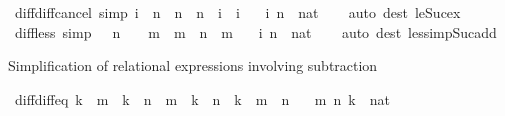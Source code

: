 \begin{isabellebody}
\ diff{\isacharunderscore}{\kern0pt}diff{\isacharunderscore}{\kern0pt}cancel\ {\isacharbrackleft}{\kern0pt}simp{\isacharbrackright}{\kern0pt}{\isacharcolon}{\kern0pt}\ {\isachardoublequoteopen}i\ {\isasymle}\ n\ {\isasymLongrightarrow}\ n\ {\isacharminus}{\kern0pt}\ {\isacharparenleft}{\kern0pt}n\ {\isacharminus}{\kern0pt}\ i{\isacharparenright}{\kern0pt}\ {\isacharequal}{\kern0pt}\ i{\isachardoublequoteclose}\isanewline
\ \ \ i\ n\ {\isacharcolon}{\kern0pt}{\isacharcolon}{\kern0pt}\ nat\isanewline
%
\isadelimproof
\ \ %
\endisadelimproof
%
\isatagproof
{}\isamarkupfalse%
\ {\isacharparenleft}{\kern0pt}auto\ dest{\isacharcolon}{\kern0pt}\ le{\isacharunderscore}{\kern0pt}Suc{\isacharunderscore}{\kern0pt}ex{\isacharparenright}{\kern0pt}%
\endisatagproof
{\isafoldproof}%
%
\isadelimproof
\isanewline
%
\endisadelimproof
\isanewline
{}\isamarkupfalse%
\ diff{\isacharunderscore}{\kern0pt}less\ {\isacharbrackleft}{\kern0pt}simp{\isacharbrackright}{\kern0pt}{\isacharcolon}{\kern0pt}\ {\isachardoublequoteopen}{}\ {\isacharless}{\kern0pt}\ n\ {\isasymLongrightarrow}\ {}\ {\isacharless}{\kern0pt}\ m\ {\isasymLongrightarrow}\ m\ {\isacharminus}{\kern0pt}\ n\ {\isacharless}{\kern0pt}\ m{\isachardoublequoteclose}\isanewline
\ \ \ i\ n\ {\isacharcolon}{\kern0pt}{\isacharcolon}{\kern0pt}\ nat\isanewline
%
\isadelimproof
\ \ %
\endisadelimproof
%
\isatagproof
{}\isamarkupfalse%
\ {\isacharparenleft}{\kern0pt}auto\ dest{\isacharcolon}{\kern0pt}\ less{\isacharunderscore}{\kern0pt}imp{\isacharunderscore}{\kern0pt}Suc{\isacharunderscore}{\kern0pt}add{\isacharparenright}{\kern0pt}%
\endisatagproof
{\isafoldproof}%
%
\isadelimproof
%
\endisadelimproof
%
\begin{isamarkuptext}%
Simplification of relational expressions involving subtraction%
\end{isamarkuptext}\isamarkuptrue%
\isamarkupfalse%
\ diff{\isacharunderscore}{\kern0pt}diff{\isacharunderscore}{\kern0pt}eq{\isacharcolon}{\kern0pt}\ {\isachardoublequoteopen}k\ {\isasymle}\ m\ {\isasymLongrightarrow}\ k\ {\isasymle}\ n\ {\isasymLongrightarrow}\ m\ {\isacharminus}{\kern0pt}\ k\ {\isacharminus}{\kern0pt}\ {\isacharparenleft}{\kern0pt}n\ {\isacharminus}{\kern0pt}\ k{\isacharparenright}{\kern0pt}\ {\isacharequal}{\kern0pt}\ m\ {\isacharminus}{\kern0pt}\ n{\isachardoublequoteclose}\isanewline
\ \ \ m\ n\ k\ {\isacharcolon}{\kern0pt}{\isacharcolon}{\kern0pt}\ nat\isanewline
%
\isadelimproof
\ \ %
\endisadelimproof
%
\isatagproof

\end{isabellebody}

